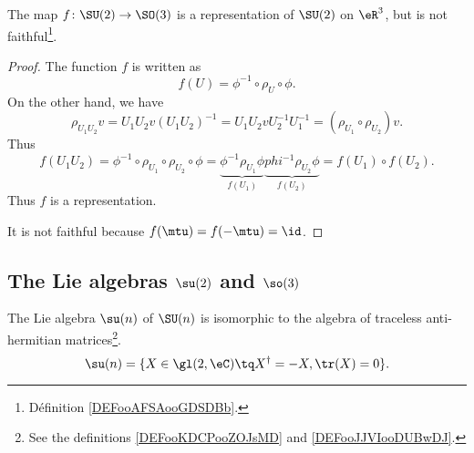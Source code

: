 \begin{proposition}
	The map \( f\colon \SU(2)\to \SO(3)\) is a representation of \( \SU(2)\) on \( \eR^3\), but is not faithful\footnote{Définition \ref{DEFooAFSAooGDSDBb}.}.
\end{proposition}

\begin{proof}
	The function \( f\) is written as
	\begin{equation}
		f(U)=\phi^{-1}\circ\rho_U\circ\phi.
	\end{equation}
	On the other hand, we have
	\begin{equation}
		\rho_{U_1U_2}v=U_1U_2v(U_1U_2)^{-1}=U_1U_2vU_2^{-1}U_1^{-1}=(\rho_{U_1}\circ\rho_{U_2})v.
	\end{equation}
	Thus
	\begin{equation}
		f(U_1U_2)=\phi^{-1}\circ\rho_{U_1}\circ\rho_{U_2}\circ\phi=\underbrace{\phi^{-1}\rho_{U_1}\phi}_{f(U_1)}\underbrace{phi^{-1}\rho_{U_2}\phi}_{f(U_2)}=f(U_1)\circ f(U_2).
	\end{equation}
	Thus \( f\) is a representation.

	It is not faithful because \( f(\mtu)=f(-\mtu)=\id\).
\end{proof}

\subsection{The Lie algebras \texorpdfstring{\( \su(2)\)}{su(2)} and \texorpdfstring{$ \so(3)$}{so(n)}}

\begin{proposition}   \label{PROPooSERWooFtxBgV}
	The Lie algebra \( \su(n)\) of \( \SU(n)\) is isomorphic to the algebra of traceless anti-hermitian matrices\footnote{See the definitions \ref{DEFooKDCPooZOJsMD} and \ref{DEFooJJVIooDUBwDJ}.}.
	\begin{equation}
		\su(n)=\{X\in\gl(2,\eC)\tq X^{\dag}=-X,\tr(X)=0\}.
	\end{equation}
\end{proposition}

